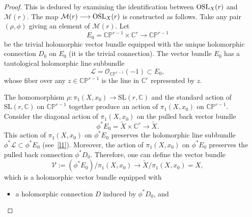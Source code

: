 \documentclass[10pt,a4paper]{amsart}
\numberwithin{equation}{section}
\begin{document}
\begin{proof}
This is deduced by examining the identification between ${\rm OSL}_X(r)$ and
${\mathcal M}(r)$. The map ${\mathcal M}(r) \longrightarrow {\rm OSL}_X(r)$
is constructed as follows. Take any pair $(\rho, \phi)$ giving an element of
${\mathcal M}(r)$. Let
\[
E_0 = {\mathbb C}{\mathbb P}^{r-1}\times {\mathbb C}^r \longrightarrow
{\mathbb C}{\mathbb P}^{r-1}
\]
be the trivial holomorphic vector bundle equipped with the unique holomorphic
connection $D_0$ on $E_0$ (it is the trivial connection). The vector bundle
$E_0$ has a tautological holomorphic line subbundle
\begin{equation}\label{l1}
{\mathcal L} = {\mathcal O}_{{\mathbb C}{\mathbb P}^{r-1}}(-1) \subset E_0,
\end{equation}
whose fiber over any $z \in {\mathbb C}{\mathbb P}^{r-1}$ is the line in
${\mathbb C}^r$ represented by $z$.

The homomorphism $\rho\colon
\pi_1(X, x_0) \longrightarrow \text{SL}(r, {\mathbb C})$ and the standard
action of $\text{SL}(r, {\mathbb C})$ on ${\mathbb C}{\mathbb P}^{r-1}$ together
produce an action of $\pi_1(X, x_0)$ on ${\mathbb C}{\mathbb P}^{r-1}$. Consider
the diagonal action of $\pi_1(X, x_0)$ on the pulled back vector bundle
\[
\phi^*E_0 = \widetilde{X}\times {\mathbb C}^r \longrightarrow \widetilde{X}.
\]
This action of $\pi_1\!(X, x_0)$ on $\phi^*E_0$ preserves the holomorphic
line subbundle $\phi^*{\mathcal L} \!\subset \!\phi^*E_0$ (see~\eqref{l1}). Moreover,
the action of $\pi_1(X, x_0)$ on $\phi^*E_0$ preserves the pulled back
connection $\phi^* D_0$. Therefore, one can define the vector bundle
\begin{equation}\label{l2}
{\mathcal V} := (\phi^*E_0)/\pi_1(X, x_0) \longrightarrow
\widetilde{X}/\pi_1(X, x_0) = X,
\end{equation}
which is a holomorphic vector bundle equipped with
\begin{itemize}\itemsep=0pt
\item a holomorphic connection $D$ induced by $\phi^* D_0$, and


\end{itemize}
\end{proof}
\end{document}
